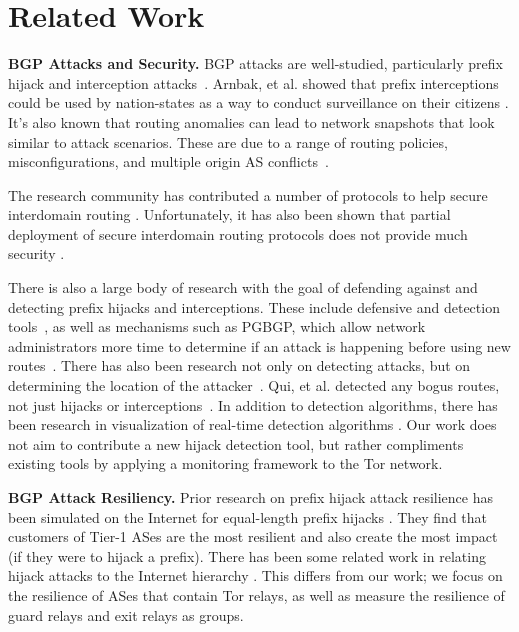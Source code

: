 \section{Related Work}

{\bf BGP Attacks and Security.}
BGP attacks are well-studied, particularly prefix hijack and interception attacks~\cite{ballani2007study, mcarthur2009stealthy, zhang2012studying}.  Arnbak, et al. showed that prefix interceptions could be used by nation-states as a way to conduct surveillance on their citizens \cite{arnbak2014loopholes}.  It's also known that routing anomalies can lead to network snapshots that look similar to attack scenarios.  These are due to a range of routing policies, misconfigurations, and multiple origin AS conflicts~\cite{caesar2005bgp, mahajan2002understanding, zhao2001analysis}.  

The research community has contributed a number of protocols to help secure interdomain routing \cite{boldyreva2012provable, chan2006modeling, gill2011let, hu2004spv, zhang2009hc, van2007interdomain}.  Unfortunately, it has also been shown that partial deployment of secure interdomain routing protocols does not provide much security \cite{lychev2013bgp}.

There is also a large body of research with the goal of defending against and detecting prefix hijacks and interceptions.  These include defensive and detection tools~\cite{lad2006phas, hu2007accurate, shi2012detecting, zhang2008ispy, zheng2007light, sriram2009comparative, zhang2007practical}, as well as mechanisms such as PGBGP, which allow network administrators more time to determine if an attack is happening before using new routes~\cite{karlin2006pretty}.  There has also been research not only on detecting attacks, but on determining the location of the attacker~\cite{qiu2009locating}.  Qui, et al. detected any bogus routes, not just hijacks or interceptions~\cite{qiu2007detecting}.  In addition to detection algorithms, there has been research in visualization of real-time detection algorithms \cite{teoh2006bgp}.  Our work does not aim to contribute a new hijack detection tool, but rather compliments existing tools by applying a monitoring framework to the Tor network.  

{\bf BGP Attack Resiliency.}
Prior research on prefix hijack attack resilience has been simulated on the Internet for equal-length prefix hijacks \cite{lad2007understanding}.  They find that customers of Tier-1 ASes are the most resilient and also create the most impact (if they were to hijack a prefix).  There has been some related work in relating hijack attacks to the Internet hierarchy \cite{zhao2012relation, zhao2012analysis}.  This differs from our work; we focus on the resilience of ASes that contain Tor relays, as well as measure the resilience of guard relays and exit relays as groups.

